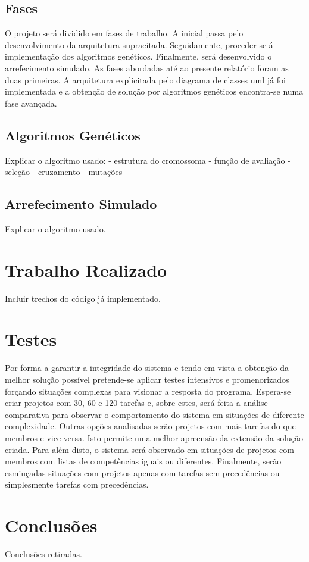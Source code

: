 \begin{titlepage}
\subsection{Fases}
\justify\normalsize 
O projeto será dividido em fases de trabalho. A inicial passa pelo desenvolvimento da arquitetura supracitada. Seguidamente, proceder-se-á implementação dos  algoritmos genéticos. Finalmente, será desenvolvido o arrefecimento simulado. As fases abordadas até ao presente relatório foram as duas primeiras. A arquitetura explicitada pelo diagrama de classes uml já foi implementada e a obtenção de solução por algoritmos genéticos encontra-se numa fase avançada.

\subsection{Algoritmos Genéticos}
\justify\normalsize
Explicar o algoritmo usado:
	- estrutura do cromossoma
	- função de avaliação
	- seleção
	- cruzamento
	- mutações

\subsection{Arrefecimento Simulado}
\justify\normalsize
Explicar o algoritmo usado.

\section{Trabalho Realizado}
\justify\normalsize
Incluir trechos do código já implementado.

\section{Testes}
\justify\normalsize
Por forma a garantir a integridade do sistema e tendo em vista a obtenção da melhor solução possível pretende-se aplicar testes intensivos e promenorizados forçando situações complexas para visionar a resposta do programa. Espera-se criar projetos com 30, 60 e 120 tarefas e, sobre estes, será feita a análise comparativa para observar o comportamento do sistema em situações de diferente complexidade. Outras opções analisadas serão projetos com mais tarefas do que membros e vice-versa. Isto permite uma melhor apreensão da extensão da solução criada. Para além disto, o sistema será observado em situações de projetos com membros com listas de competências iguais ou diferentes. Finalmente, serão esmiuçadas situações com projetos apenas com tarefas sem precedências ou simplesmente tarefas com precedências.

\section{Conclusões}
\justify\normalsize
Conclusões retiradas.

\printindex

\end{titlepage}
